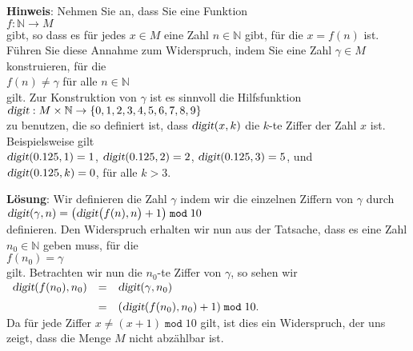 \documentclass{article}
\newcommand{\solution}{
\vspace*{0.3cm}

\noindent
\textbf{L\"osung}: }
\begin{document}
\noindent
\textbf{Hinweis}: Nehmen Sie an, dass Sie eine Funktion
\\[0.2cm]
\hspace*{1.3cm}
$f: \mathbb{N} \rightarrow M$
\\[0.2cm]
gibt, so dass es f\"ur jedes $x \in M$ eine Zahl $n \in \mathbb{N}$ gibt, f\"ur die
$x = f(n)$ ist.  F\"uhren Sie diese Annahme zum Widerspruch, indem Sie eine Zahl 
$\gamma \in M$ konstruieren, f\"ur die 
\\[0.2cm]
\hspace*{1.3cm}
$f(n) \not= \gamma$ \quad f\"ur alle $n \in \mathbb{N}$
\\[0.2cm]
gilt.  Zur Konstruktion von $\gamma$ ist es sinnvoll die Hilfsfunktion
\\[0.2cm]
\hspace*{1.3cm}
$\textsl{digit}: M \times \mathbb{N} \rightarrow \{ 0, 1, 2, 3, 4, 5, 6,7, 8, 9\}$
\\[0.2cm]
zu benutzen, die so definiert ist, dass
$\textsl{digit}(x,k)$
die $k$-te Ziffer der Zahl $x$ ist.  Beispielsweise gilt
\\[0.2cm]
\hspace*{1.3cm}
$\textsl{digit}(0.125, 1) = 1$, \quad
$\textsl{digit}(0.125, 2) = 2$, \quad
$\textsl{digit}(0.125, 3) = 5$, \quad und 
\\[0.2cm]
\hspace*{1.3cm}
$\textsl{digit}(0.125, k) = 0$, \quad f\"ur alle $k > 3$.

\solution
Wir definieren die Zahl $\gamma$ indem wir die einzelnen Ziffern von $\gamma$ durch
\\[0.2cm]
\hspace*{1.3cm}
$\textsl{digit}(\gamma,n) = \bigl(\textsl{digit}\bigl(f(n),n\bigr) + 1\bigr) \;\mathtt{mod}\; 10$
\\[0.2cm]
definieren.  Den Widerspruch erhalten wir nun aus der Tatsache, dass es eine Zahl $n_0 \in \mathbb{N}$ geben 
muss, f\"ur die
\\[0.2cm]
\hspace*{1.3cm}
$f(n_0) = \gamma$
\\[0.2cm]
gilt.  Betrachten wir nun die $n_0$-te Ziffer von $\gamma$, so sehen wir
\\[0.2cm]
\hspace*{1.3cm}
$
\begin{array}[t]{lcl}
\textsl{digit}(f(n_0), n_0) & = & \textsl{digit}(\gamma, n_0)                          \\[0.2cm]
                            & = & (\textsl{digit}(f(n_0),n_0) + 1) \;\mathtt{mod}\; 10. 
\end{array}
$
\\[0.2cm]
Da f\"ur jede Ziffer $x \not= (x + 1) \;\mathtt{mod}\; 10$ gilt, ist dies ein Widerspruch, der uns zeigt,
dass die Menge $M$ nicht abz\"ahlbar ist.
\vspace{0.3cm}
\end{document}
